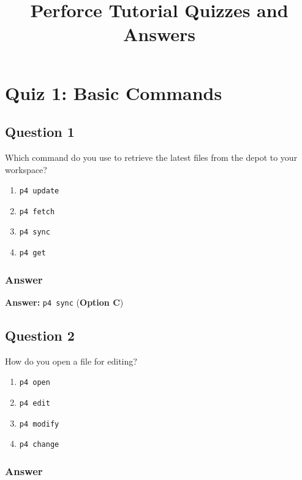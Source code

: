 \documentclass{article}
\begin{document}
\title{Perforce Tutorial Quizzes and Answers}
\author{}
\date{}

\maketitle

\section*{Quiz 1: Basic Commands}

\subsection*{Question 1}

Which command do you use to retrieve the latest files from the depot to your workspace?

\begin{enumerate}
    \item \texttt{p4 update}
    \item \texttt{p4 fetch}
    \item \texttt{p4 sync}
    \item \texttt{p4 get}
\end{enumerate}

\subsubsection*{Answer}

\textbf{Answer:} \texttt{p4 sync} (\textbf{Option C})

\hrulefill

\subsection*{Question 2}

How do you open a file for editing?

\begin{enumerate}
    \item \texttt{p4 open}
    \item \texttt{p4 edit}
    \item \texttt{p4 modify}
    \item \texttt{p4 change}
\end{enumerate}

\subsubsection*{Answer}
\end{document}
